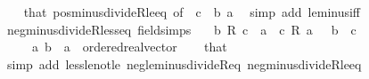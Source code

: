 \begin{isabellebody}
%
\isadelimproof
\ \ %
\endisadelimproof
%
\isatagproof
{}\isamarkupfalse%
\ that\ pos{\isacharunderscore}{\kern0pt}minus{\isacharunderscore}{\kern0pt}divideR{\isacharunderscore}{\kern0pt}le{\isacharunderscore}{\kern0pt}eq\ {\isacharbrackleft}{\kern0pt}of\ {\isachardoublequoteopen}{\isacharminus}{\kern0pt}\ c{\isachardoublequoteclose}\ {\isachardoublequoteopen}{\isacharminus}{\kern0pt}\ b{\isachardoublequoteclose}\ a{\isacharbrackright}{\kern0pt}\ \isamarkupfalse%
\ {\isacharparenleft}{\kern0pt}simp\ add{\isacharcolon}{\kern0pt}\ le{\isacharunderscore}{\kern0pt}minus{\isacharunderscore}{\kern0pt}iff{\isacharparenright}{\kern0pt}%
\endisatagproof
{\isafoldproof}%
%
\isadelimproof
\ \isanewline
%
\endisadelimproof
\isanewline
{}\isamarkupfalse%
\ neg{\isacharunderscore}{\kern0pt}minus{\isacharunderscore}{\kern0pt}divideR{\isacharunderscore}{\kern0pt}less{\isacharunderscore}{\kern0pt}eq\ {\isacharbrackleft}{\kern0pt}field{\isacharunderscore}{\kern0pt}simps{\isacharbrackright}{\kern0pt}{\isacharcolon}{\kern0pt}\isanewline
\ \ {\isachardoublequoteopen}{\isacharminus}{\kern0pt}\ {\isacharparenleft}{\kern0pt}b\ {\isacharslash}{\kern0pt}\isactrlsub R\ c{\isacharparenright}{\kern0pt}\ {\isacharless}{\kern0pt}\ a\ {\isasymlongleftrightarrow}\ c\ {\isacharasterisk}{\kern0pt}\isactrlsub R\ a\ {\isacharless}{\kern0pt}\ {\isacharminus}{\kern0pt}\ b{\isachardoublequoteclose}\ \ {\isachardoublequoteopen}c\ {\isacharless}{\kern0pt}\ {}{\isachardoublequoteclose}\isanewline
\ \ \ \ \ a\ b\ {\isacharcolon}{\kern0pt}{\isacharcolon}{\kern0pt}\ {\isachardoublequoteopen}{\isacharprime}{\kern0pt}a\ {\isacharcolon}{\kern0pt}{\isacharcolon}{\kern0pt}\ ordered{\isacharunderscore}{\kern0pt}real{\isacharunderscore}{\kern0pt}vector{\isachardoublequoteclose}\isanewline
%
\isadelimproof
\ \ %
\endisadelimproof
%
\isatagproof
{}\isamarkupfalse%
\ that\ \isamarkupfalse%
\ {\isacharparenleft}{\kern0pt}simp\ add{\isacharcolon}{\kern0pt}\ less{\isacharunderscore}{\kern0pt}le{\isacharunderscore}{\kern0pt}not{\isacharunderscore}{\kern0pt}le\ neg{\isacharunderscore}{\kern0pt}le{\isacharunderscore}{\kern0pt}minus{\isacharunderscore}{\kern0pt}divideR{\isacharunderscore}{\kern0pt}eq\ neg{\isacharunderscore}{\kern0pt}minus{\isacharunderscore}{\kern0pt}divideR{\isacharunderscore}{\kern0pt}le{\isacharunderscore}{\kern0pt}eq{\isacharparenright}{\kern0pt}%
\endisatagproof
{\isafoldproof}%
%
\isadelimproof
\isanewline
%
\endisadelimproof
\isanewline
{}\isamarkupfalse%

\end{isabellebody}
